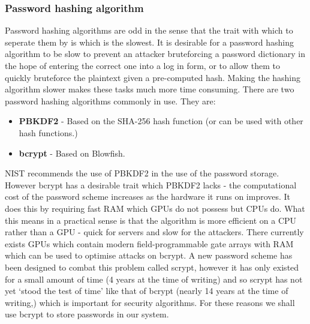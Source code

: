 \documentclass[12pt, titlepage]{article}
\begin{document}
\subsubsection{Password hashing algorithm}
Password hashing algorithms are odd in the sense that the trait with which to seperate them by is which is the slowest. It is desirable for a password hashing algorithm to be slow to prevent an attacker bruteforcing a password dictionary in the hope of entering the correct one into a log in form, or to allow them to quickly bruteforce the plaintext given a pre-computed hash. Making the hashing algorithm slower makes these tasks much more time consuming.
\newline There are two password hashing algorithms commonly in use. They are:
\begin{itemize}
	\item \textbf{PBKDF2} - Based on the SHA-256 hash function (or can be used with other hash functions.)
	\item \textbf{bcrypt} - Based on Blowfish.
\end{itemize}
NIST recommends the use of PBKDF2 in the use of the password storage.\cite{nistPassword} However bcrypt has a desirable trait which PBKDF2 lacks - the computational cost of the password scheme increases as the hardware it runs on improves. It does this by requiring fast RAM which GPUs do not possess but CPUs do.\cite{bcryptPaper} What this means in a practical sense is that the algorithm is more efficient on a CPU rather than a GPU - quick for servers and slow for the attackers.
\newline \indent There currently exists GPUs which contain modern field-programmable gate arrays with RAM which can be used to optimise attacks on bcrypt. A new password scheme has been designed to combat this problem called scrypt\cite{scrypt}, however it has only existed for a small amount of time (4 years at the time of writing) and so scrypt has not yet `stood the test of time' like that of bcrypt (nearly 14 years at the time of writing,) which is important for security algorithms.
\newline \indent For these reasons we shall use bcrypt to store passwords in our system.
\newline 
\end{document}
